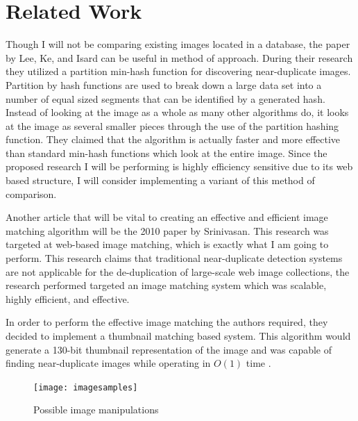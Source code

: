 \documentclass[11pt]{article}
\begin{document}
\vspace*{-.1in}
\section{Related Work}
\label{sec:relatedwork}
\vspace*{-.1in}


Though I will not be comparing existing images located in a database, the paper by Lee, Ke, and Isard \cite{Lee:2010} can be useful in method of approach. During their research they utilized a partition min-hash function for discovering near-duplicate images. Partition by hash functions are used to break down a large data set into a number of equal sized segments that can be identified by a generated hash. Instead of looking at the image as a whole as many other algorithms do, it looks at the image as several smaller pieces through the use of the partition hashing function. They claimed that the algorithm is actually faster and more effective than standard min-hash functions which look at the entire image. Since the proposed research I will be performing is highly efficiency sensitive due to its web based structure, I will consider implementing a variant of this method of comparison.

Another article that will be vital to creating an effective and efficient image matching algorithm will be the 2010 paper by Srinivasan. This research was targeted at web-based image matching, which is exactly what I am going to perform. This research claims that traditional near-duplicate detection systems are not applicable for the de-duplication of large-scale web image collections, \cite{Srinivasan:2008} the research performed targeted an image matching system which was scalable, highly efficient, and effective.

In order to perform the effective image matching the authors required, they decided to implement a thumbnail matching based system. This algorithm would generate a 130-bit thumbnail representation of the image and was capable of finding near-duplicate images while operating in $O(1)$ time \cite{Srinivasan:2008}.

\begin{figure}[htbp]
\centering
\texttt{[image: imagesamples]}
\caption{Possible image manipulations}
\label{imgsample}
\end{figure}
\end{document}
